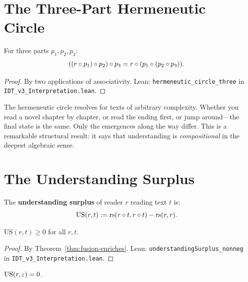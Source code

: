 \section{The Three-Part Hermeneutic Circle}

\begin{theorem}
\label{thm:three-part-circle}
For three parts $p_1, p_2, p_3$:
\[
((r \circ p_1) \circ p_2) \circ p_3 = r \circ (p_1 \circ (p_2 \circ p_3)).
\]
\end{theorem}

\begin{proof}
By two applications of associativity.
Lean: \texttt{hermeneutic\_circle\_three} in \texttt{IDT\_v3\_Interpretation.lean}.
\end{proof}

\begin{interpretation}
The hermeneutic circle resolves for texts of arbitrary complexity. Whether
you read a novel chapter by chapter, or read the ending first, or jump
around---the final state is the same. Only the emergences along the way differ.
This is a remarkable structural result: it says that understanding is
\emph{compositional} in the deepest algebraic sense.
\end{interpretation}

\section{The Understanding Surplus}

\begin{definition}
\label{def:understanding-surplus}
The \textbf{understanding surplus} of reader $r$ reading text $t$ is:
\[
\mathrm{US}(r, t) := \mathrm{rs}(r \circ t, r \circ t) - \mathrm{rs}(r, r).
\]
\end{definition}

\begin{theorem}
\label{thm:us-nonneg}
$\mathrm{US}(r, t) \geq 0$ for all $r, t$.
\end{theorem}

\begin{proof}
By Theorem~\ref{thm:fusion-enriches}.
Lean: \texttt{understandingSurplus\_nonneg} in \texttt{IDT\_v3\_Interpretation.lean}.
\end{proof}

\begin{theorem}
\label{thm:us-void-text}
$\mathrm{US}(r, \varepsilon) = 0$.
\end{theorem}

